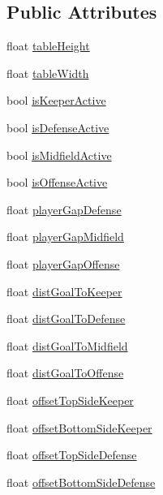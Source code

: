 \subsection*{Public Attributes}
\begin{DoxyCompactItemize}
\item 
float \hyperlink{class_table_config_a8234f8b9c9f4c28e87e5f0cc5d4cff0f}{table\+Height}
\item 
float \hyperlink{class_table_config_a1a38ba8277209a5e9b87b49c5291260b}{table\+Width}
\item 
bool \hyperlink{class_table_config_af761d18500b327c6c277ee02269b7915}{is\+Keeper\+Active}
\item 
bool \hyperlink{class_table_config_a24390bdaaa56c395e2cf688f896c948c}{is\+Defense\+Active}
\item 
bool \hyperlink{class_table_config_a89d806fa8eb7c16570de486d8371e71a}{is\+Midfield\+Active}
\item 
bool \hyperlink{class_table_config_aaac0a94f895d8322edea69a0dee190e3}{is\+Offense\+Active}
\item 
float \hyperlink{class_table_config_aa51ef6539c96a6c68ae15526d3a3c30a}{player\+Gap\+Defense}
\item 
float \hyperlink{class_table_config_afaa310ca3e93f92d50e6500d619d9d73}{player\+Gap\+Midfield}
\item 
float \hyperlink{class_table_config_a8788da31ad50cf733c0d20cb091cf6e9}{player\+Gap\+Offense}
\item 
float \hyperlink{class_table_config_af9f5e70f0076b58f9af98f1dd1fdfcb7}{dist\+Goal\+To\+Keeper}
\item 
float \hyperlink{class_table_config_ad830228b7a0c21ef931fe369505723be}{dist\+Goal\+To\+Defense}
\item 
float \hyperlink{class_table_config_a175ef04f0af390a468b4b658df57340c}{dist\+Goal\+To\+Midfield}
\item 
float \hyperlink{class_table_config_a18a6eb8108758bb36ccd05533b4f816f}{dist\+Goal\+To\+Offense}
\item 
float \hyperlink{class_table_config_ae8fdd03d92b244f773ca94f398a9af97}{offset\+Top\+Side\+Keeper}
\item 
float \hyperlink{class_table_config_afc31cef408c8b9368bd274561508018c}{offset\+Bottom\+Side\+Keeper}
\item 
float \hyperlink{class_table_config_a7835330915d7a8a355d97d88a7e2721f}{offset\+Top\+Side\+Defense}
\item 
float \hyperlink{class_table_config_ae4c94bc14d57d8aaa50554847de34de4}{offset\+Bottom\+Side\+Defense}

\end{DoxyCompactItemize}
